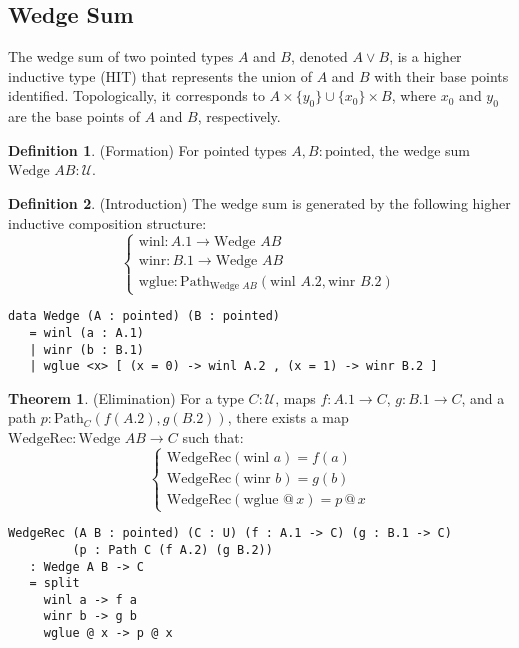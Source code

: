 \documentclass{article}
\theoremstyle{definition}
\newtheorem{theorem}{Theorem}
\newtheorem{definition}{Definition}
\begin{document}
\newpage

\subsection{Wedge Sum}
The wedge sum of two pointed types $A$ and $B$, denoted $A \vee B$,
is a higher inductive type (HIT) that represents the union of $A$
and $B$ with their base points identified. Topologically,
it corresponds to $A \times \{ y_0 \} \cup \{ x_0 \} \times B$,
where $x_0$ and $y_0$ are the base points of $A$ and $B$, respectively.

\begin{definition} (Formation)
For pointed types $A, B : \text{pointed}$, the wedge sum $\text{Wedge } A B : \mathcal{U}$.
\end{definition}

\begin{definition} (Introduction)
The wedge sum is generated by the following higher inductive composition structure:
\[
\begin{cases}
\text{winl} : A.1 \to \text{Wedge } A B \\
\text{winr} : B.1 \to \text{Wedge } A B \\
\text{wglue} : \text{Path}_{\text{Wedge } A B} (\text{winl } A.2, \text{winr } B.2)
\end{cases}
\]
\begin{lstlisting}
data Wedge (A : pointed) (B : pointed)
   = winl (a : A.1)
   | winr (b : B.1)
   | wglue <x> [ (x = 0) -> winl A.2 , (x = 1) -> winr B.2 ]
\end{lstlisting}
\end{definition}

\begin{theorem} (Elimination)
For a type $C : \mathcal{U}$, maps $f : A.1 \to C$, $g : B.1 \to C$, and a path $p : \text{Path}_C (f (A.2), g (B.2))$, there exists a map $\text{WedgeRec} : \text{Wedge } A B \to C$ such that:
\[
\begin{cases}
\text{WedgeRec}(\text{winl } a) = f(a) \\
\text{WedgeRec}(\text{winr } b) = g(b) \\
\text{WedgeRec}(\text{wglue } @ \, x) = p \, @ \, x
\end{cases}
\]
\begin{lstlisting}
WedgeRec (A B : pointed) (C : U) (f : A.1 -> C) (g : B.1 -> C)
         (p : Path C (f A.2) (g B.2))
   : Wedge A B -> C
   = split
     winl a -> f a
     winr b -> g b
     wglue @ x -> p @ x
\end{lstlisting}
\end{theorem}
\end{document}
